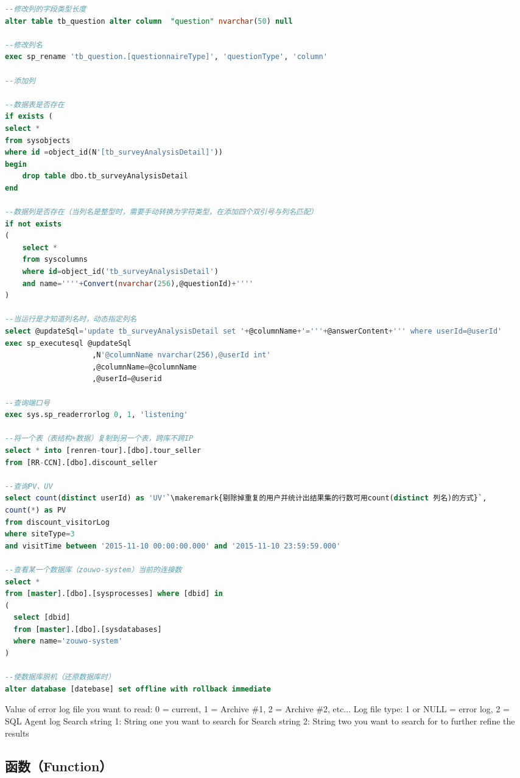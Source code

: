 \documentclass{book}
\newcounter{coderemarks}   %
\newcounter{codevar}     %
\newcommand{\circlemark}[1]{%
\tikz\node[text=white,font=\sffamily\bfseries,inner sep=0.2mm,draw,circle,fill=black]{#1};}
\newcommand{\makeremark}[1]{%
\circlemark{\arabic{coderemarks}}%
\global \expandafter\def \csname codebox\the\value{coderemarks}\endcsname{#1}%
\stepcounter{coderemarks}}
\newcommand{\showremarks}{%
\begin{list}{\circlemark{\arabic{codevar}}} %
{} %
\whiledo{\value{codevar} < \value{coderemarks}}{ %
\item \expandafter\csname codebox\the\value{codevar}\endcsname %
\stepcounter{codevar}} %
\end{list} %
\setcounter{coderemarks}{1}%
\setcounter{codevar}{1}%
}
\begin{document}
\begin{lstlisting}[language=SQL]
--修改列的字段类型长度
alter table tb_question alter column  "question" nvarchar(50) null

--修改列名
exec sp_rename 'tb_question.[questionnaireType]', 'questionType', 'column'

--添加列

--数据表是否存在
if exists (
select * 
from sysobjects 
where id =object_id(N'[tb_surveyAnalysisDetail]'))
begin
	drop table dbo.tb_surveyAnalysisDetail
end

--数据列是否存在（当列名是整型时，需要手动转换为字符类型，在添加四个双引号与列名匹配）	
if not exists
(
	select * 
	from syscolumns 
	where id=object_id('tb_surveyAnalysisDetail') 
	and name=''''+Convert(nvarchar(256),@questionId)+''''
) 

--当运行是才知道列名时，动态指定列名
select @updateSql='update tb_surveyAnalysisDetail set '+@columnName+'='''+@answerContent+''' where userId=@userId'
exec sp_executesql @updateSql
					,N'@columnName nvarchar(256),@userId int'
					,@columnName=@columnName
					,@userId=@userid

--查询端口号
exec sys.sp_readerrorlog 0, 1, 'listening'

--将一个表（表结构+数据）复制到另一个表，跨库不跨IP
select * into [renren-tour].[dbo].tour_seller
from [RR-CCN].[dbo].discount_seller

--查询PV、UV
select count(distinct userId) as 'UV'`\makeremark{剔除掉重复的用户并统计出结果集的行数可用count(distinct 列名)的方式}`,
count(*) as PV
from discount_visitorLog
where siteType=3
and visitTime between '2015-11-10 00:00:00.000' and '2015-11-10 23:59:59.000'

--查看某一个数据库（zouwo-system）当前的连接数
select * 
from [master].[dbo].[sysprocesses] where [dbid] in 
(
  select [dbid]
  from [master].[dbo].[sysdatabases] 
  where name='zouwo-system'
)

--使数据库脱机（还原数据库时）
alter database [datebase] set offline with rollback immediate
\end{lstlisting}

\showremarks

Value of error log file you want to read: 0 = current, 1 = Archive \#1, 2 = Archive \#2, etc...
Log file type: 1 or NULL = error log, 2 = SQL Agent log
Search string 1: String one you want to search for
Search string 2: String two you want to search for to further refine the results

\subsection{函数（Function）}
\end{document}
